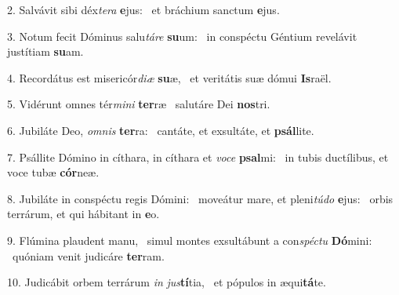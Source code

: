 2. Salvávit sibi déx\textit{te}\textit{ra} \textbf{e}jus: \ast\  et bráchium sanctum \textbf{e}jus.\

3. Notum fecit Dóminus salu\textit{tá}\textit{re} \textbf{su}um: \ast\  in conspéctu Géntium revelávit justítiam \textbf{su}am.\

4. Recordátus est misericór\textit{di}\textit{æ} \textbf{su}æ, \ast\  et veritátis suæ dómui \textbf{Is}raël.\

5. Vidérunt omnes tér\textit{mi}\textit{ni} \textbf{ter}ræ \ast\  salutáre Dei \textbf{nos}tri.\

6. Jubiláte Deo, \textit{om}\textit{nis} \textbf{ter}ra: \ast\  cantáte, et exsultáte, et \textbf{psál}lite.\

7. Psállite Dómino in cíthara, in cíthara et \textit{vo}\textit{ce} \textbf{psal}mi: \ast\  in tubis ductílibus, et voce tubæ \textbf{cór}neæ.\

8. Jubiláte in conspéctu regis Dómini: \dag\  moveátur mare, et pleni\textit{tú}\textit{do} \textbf{e}jus: \ast\  orbis terrárum, et qui hábitant in \textbf{e}o.\

9. Flúmina plaudent manu, \dag\  simul montes exsultábunt a con\textit{spéc}\textit{tu} \textbf{Dó}mini: \ast\  quóniam venit judicáre \textbf{ter}ram.\

10. Judicábit orbem terrárum \textit{in} \textit{jus}\textbf{tí}tia, \ast\  et pópulos in æqui\textbf{tá}te.\

